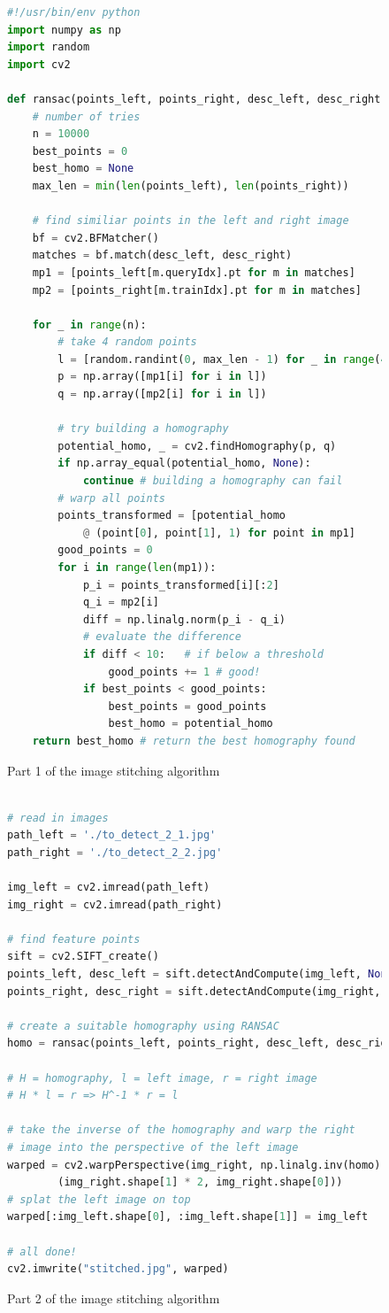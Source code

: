 \documentclass[a4paper, titlepage,12pt]{article}
\begin{document}
	\begin{figure}[H]
		\begin{lstlisting}[language=Python]
#!/usr/bin/env python
import numpy as np
import random
import cv2

def ransac(points_left, points_right, desc_left, desc_right):
	# number of tries
    n = 10000
    best_points = 0
    best_homo = None
    max_len = min(len(points_left), len(points_right))

	# find similiar points in the left and right image
    bf = cv2.BFMatcher()
    matches = bf.match(desc_left, desc_right)
    mp1 = [points_left[m.queryIdx].pt for m in matches]
    mp2 = [points_right[m.trainIdx].pt for m in matches]

    for _ in range(n):
		# take 4 random points
        l = [random.randint(0, max_len - 1) for _ in range(4)]
        p = np.array([mp1[i] for i in l])
        q = np.array([mp2[i] for i in l])

		# try building a homography
        potential_homo, _ = cv2.findHomography(p, q)
        if np.array_equal(potential_homo, None):
            continue # building a homography can fail
		# warp all points
        points_transformed = [potential_homo 
			@ (point[0], point[1], 1) for point in mp1]
        good_points = 0
        for i in range(len(mp1)):
            p_i = points_transformed[i][:2]
            q_i = mp2[i]
            diff = np.linalg.norm(p_i - q_i)
			# evaluate the difference
            if diff < 10:	# if below a threshold
                good_points += 1 # good!
            if best_points < good_points:
                best_points = good_points
                best_homo = potential_homo
    return best_homo # return the best homography found
		\end{lstlisting}
		\caption{Part 1 of the image stitching algorithm}
	\end{figure}
	\begin{figure}[H]
		\begin{lstlisting}[language=Python]

# read in images
path_left = './to_detect_2_1.jpg'
path_right = './to_detect_2_2.jpg'

img_left = cv2.imread(path_left)
img_right = cv2.imread(path_right)

# find feature points
sift = cv2.SIFT_create()
points_left, desc_left = sift.detectAndCompute(img_left, None)
points_right, desc_right = sift.detectAndCompute(img_right, None)

# create a suitable homography using RANSAC
homo = ransac(points_left, points_right, desc_left, desc_right)

# H = homography, l = left image, r = right image
# H * l = r => H^-1 * r = l

# take the inverse of the homography and warp the right
# image into the perspective of the left image
warped = cv2.warpPerspective(img_right, np.linalg.inv(homo), 
		(img_right.shape[1] * 2, img_right.shape[0]))
# splat the left image on top
warped[:img_left.shape[0], :img_left.shape[1]] = img_left

# all done!
cv2.imwrite("stitched.jpg", warped)
		\end{lstlisting}
		\caption{Part 2 of the image stitching algorithm}
	\end{figure}
\end{document}
